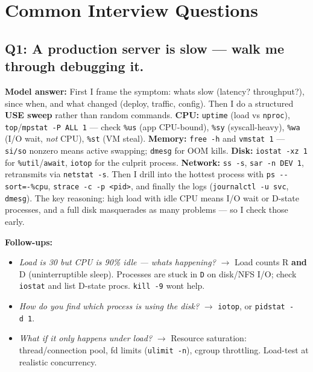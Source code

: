 \documentclass[11pt]{article}
\providecommand{\tightlist}{\setlength{\itemsep}{1pt}\setlength{\parskip}{0pt}}
\begin{document}
\section{Common Interview Questions}\label{common-interview-questions}

\subsection{Q1: A production server is slow --- walk me through debugging it.}\label{q1-a-production-server-is-slow--walk-me-through-debugging-it}

\textbf{Model answer:} First I frame the symptom: what\textquotesingle s slow (latency? throughput?), since when, and what changed (deploy, traffic, config). Then I do a structured \textbf{USE sweep} rather than random commands. \textbf{CPU:} \texttt{uptime} (load vs \texttt{nproc}), \texttt{top}/\texttt{mpstat\ -P\ ALL\ 1} --- check \texttt{\%us} (app CPU-bound), \texttt{\%sy} (syscall-heavy), \texttt{\%wa} (I/O wait, \emph{not} CPU), \texttt{\%st} (VM steal). \textbf{Memory:} \texttt{free\ -h} and \texttt{vmstat\ 1} --- \texttt{si/so} nonzero means active swapping; \texttt{dmesg} for OOM kills. \textbf{Disk:} \texttt{iostat\ -xz\ 1} for \texttt{\%util}/\texttt{await}, \texttt{iotop} for the culprit process. \textbf{Network:} \texttt{ss\ -s}, \texttt{sar\ -n\ DEV\ 1}, retransmits via \texttt{netstat\ -s}. Then I drill into the hottest process with \texttt{ps\ -\/-sort=-\%cpu}, \texttt{strace\ -c\ -p\ \textless{}pid\textgreater{}}, and finally the logs (\texttt{journalctl\ -u\ svc}, \texttt{dmesg}). The key reasoning: high load with idle CPU means I/O wait or D-state processes, and a full disk masquerades as many problems --- so I check those early.

\textbf{Follow-ups:}

\begin{itemize}
\tightlist
\item
  \emph{Load is 30 but CPU is 90\% idle --- what\textquotesingle s happening?} \(\rightarrow\) Load counts R \textbf{and} D (uninterruptible sleep). Processes are stuck in \texttt{D} on disk/NFS I/O; check \texttt{iostat} and list D-state procs. \texttt{kill\ -9} won\textquotesingle t help.
\item
  \emph{How do you find which process is using the disk?} \(\rightarrow\) \texttt{iotop}, or \texttt{pidstat\ -d\ 1}.
\item
  \emph{What if it only happens under load?} \(\rightarrow\) Resource saturation: thread/connection pool, fd limits (\texttt{ulimit\ -n}), cgroup throttling. Load-test at realistic concurrency.
\end{itemize}
\end{document}
